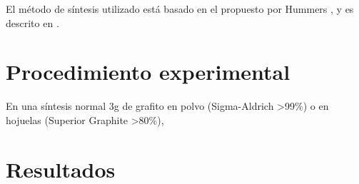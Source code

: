 El método de síntesis utilizado está basado en el propuesto por Hummers \cite{Hummers1958}, y es descrito en \cite{Abdolhosseinzadeh2015}.
\section{Procedimiento experimental}
En una síntesis normal 3g de grafito en polvo (Sigma-Aldrich >99\%) o en hojuelas (Superior Graphite >80\%), 

\section{Resultados}